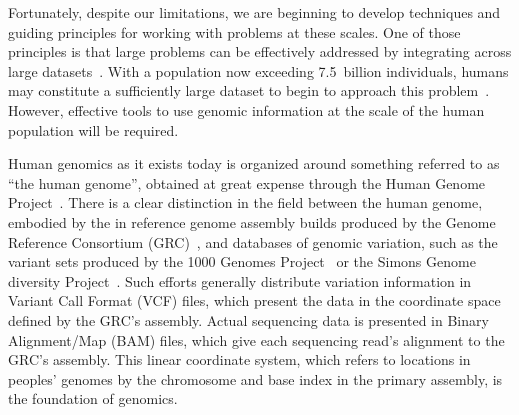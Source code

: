 Fortunately, despite our limitations, we are beginning to develop techniques and guiding principles for working with problems at these scales. One of those principles is that large problems can be effectively addressed by integrating across large datasets~\cite{halevy2009unreasonable}. With a population now exceeding 7.5~billion individuals, humans may constitute a sufficiently large dataset to begin to approach this problem~\cite{talton2017economics}. However, effective tools to use genomic information at the scale of the human population will be required.

Human genomics as it exists today is organized around something referred to as ``the human genome'', obtained at great expense through the Human Genome Project~\cite{powledge2003human}. There is a clear distinction in the field between the human genome, embodied by the  in reference genome assembly builds produced by the Genome Reference Consortium (GRC)~\cite{schneider2013genome}, and databases of genomic variation, such as the variant sets produced by the 1000 Genomes Project~\cite{10002015global} or the Simons Genome diversity Project~\cite{simons2014simons,simons2017simons}. Such efforts generally distribute variation information in Variant Call Format (VCF) files, which present the data in the coordinate space defined by the GRC's assembly. Actual sequencing data is presented in Binary Alignment/Map (BAM) files, which give each sequencing read's alignment to the GRC's assembly. This linear coordinate system, which refers to locations in peoples' genomes by the chromosome and base index in the primary assembly, is the foundation of genomics.

